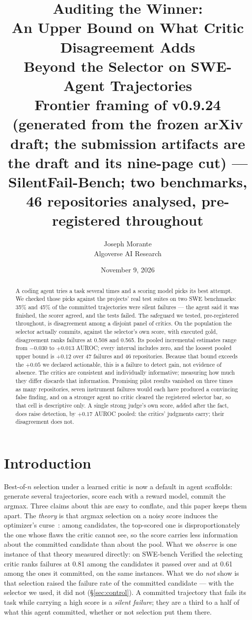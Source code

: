 \documentclass[11pt]{article}
\title{\textbf{Auditing the Winner:\\[2pt] An Upper Bound on What Critic Disagreement Adds\\ Beyond the Selector on SWE-Agent Trajectories}\\[6pt]
\normalsize\textnormal{Frontier framing of v0.9.24 (generated from the frozen arXiv draft; the submission artifacts are the draft and its nine-page cut) --- SilentFail-Bench; two benchmarks, 46 repositories analysed, pre-registered throughout}}
\author{Joseph Morante\\ \small Algoverse AI Research}
\date{\small November 9, 2026}
\begin{document}
\maketitle

\begin{abstract}
A coding agent tries a task several times and a scoring model picks its best attempt. We checked those picks against the projects' real test suites on two SWE benchmarks: 35\% and 45\% of the committed trajectories were silent failures --- the agent said it was finished, the scorer agreed, and the tests failed. The safeguard we tested, pre-registered throughout, is disagreement among a disjoint panel of critics. On the population the selector actually commits, against the selector's own score, with executed gold, disagreement ranks failures at 0.508 and 0.565. Its pooled incremental estimates range from $-0.030$ to $+0.013$ AUROC; every interval includes zero, and the loosest pooled upper bound is $+0.12$ over 47 failures and 46 repositories. Because that bound exceeds the $+0.05$ we declared actionable, this is a failure to detect gain, not evidence of absence. The critics are consistent and individually informative; measuring how much they differ discards that information. Promising pilot results vanished on three times as many repositories, seven instrument failures would each have produced a convincing false finding, and on a stronger agent no critic cleared the registered selector bar, so that cell is descriptive only. A single strong judge's own score, added after the fact, does raise detection, by $+0.17$ AUROC pooled: the critics' judgments carry; their disagreement does not.
\end{abstract}

\section{Introduction}
Best-of-$n$ selection under a learned critic is now a default in agent scaffolds: generate several trajectories, score each with a reward model, commit the argmax. Three claims about this are easy to conflate, and this paper keeps them apart. The \emph{theory} is that argmax selection on a noisy score induces the optimizer's curse~\citep{smith2006optimizer}: among candidates, the top-scored one is disproportionately the one whose flaws the critic cannot see, so the score carries less information about the committed candidate than about the pool. What we \emph{observe} is one instance of that theory measured directly: on SWE-bench Verified the selecting critic ranks failures at 0.81 among the candidates it passed over and at 0.61 among the ones it committed, on the same instances. What we do \emph{not} show is that selection raised the failure rate of the committed candidate --- with the selector we used, it did not (\S\ref{sec:control}). A committed trajectory that fails its task while carrying a high score is a \emph{silent failure}; they are a third to a half of what this agent committed, whether or not selection put them there.
\end{document}
